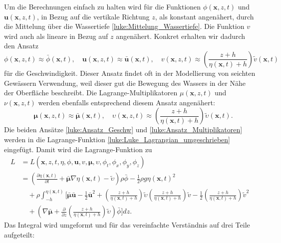 Um die Berechnungen einfach zu halten wird für die Funktionen $\phi (\bm{x},z,t)$ und $\bm{u} (\bm{x},z,t)$, in Bezug auf die vertikale Richtung $z$, als konstant angenähert, durch die Mittelung über die Wassertiefe \eqref{luke:Mittelung_Wassertiefe}.
Die Funktion $v$ wird auch als lineare in Bezug auf $z$ angenähert. 
Konkret erhalten wir dadurch den Ansatz
\begin{equation}
	\phi(\bm{x},z,t) \approx \bar{\phi}(\bm{x}, t), \quad \bm{u}(\bm{x},z,t) \approx \bar{\bm{u}}(\bm{x}, t), \quad v(\bm{x},z,t) \approx \left(\frac{z + h}{\eta(\bm{x}, t) + h}\right) \tilde{v}(\bm{x}, t)
	\label{luke:Ansatz_Geschw}
\end{equation}
für die Geschwindigkeit.
Dieser Ansatz findet oft in der Modellierung von seichten Gewässern Verwendung, weil dieser gut die Bewegung des Wassers in der Nähe der Oberfläche beschreibt.
Die Lagrange-Multiplikatoren $\mu(\bm{x},z,t)$ und $\nu(\bm{x},z,t)$ werden ebenfalls entsprechend diesem Ansatz angenähert:
\begin{equation}
	\quad \bm{\mu}(\bm{x},z,t) \approx \bar{\bm{\mu}}(\bm{x}, t), \quad \upsilon(\bm{x},z,t) \approx \left(\frac{z + h}{\eta(\bm{x}, t) + h}\right)\tilde{\upsilon}(\bm{x}, t).
	\label{luke:Ansatz_Multiplikatoren}
\end{equation}
Die beiden Ansätze \eqref{luke:Ansatz_Geschw} und \eqref{luke:Ansatz_Multiplikatoren} werden in die Lagrange-Funktion \eqref{luke:Luke_Lagrangian_umgeschrieben} eingefügt.
Damit wird die Lagrange-Funktion zu
\begin{align*}
	L&=
	L(\bm{x},z,t,\eta,\phi,\bm{u}, v, \bm{\mu},\upsilon,\phi_t,\phi_x,\phi_y,\phi_z)
	\\
	&=
	\left(\frac{\partial \eta(\bm{x}, t)}{\partial t}
	+
	\bar{\bm{\mu}}  \nabla \eta(\bm{x}, t)
	-
	\widetilde{\upsilon}\right)\rho \bar{\phi}
	-
	\frac{1}{2} \rho g \eta(\bm{x}, t)^2
	\\
	&\quad+
	\rho\int_{-h}^{\eta(\bm{x}, t)} \Bigg[ \bar{\bm{\mu}}  \bar{\bm{u}} - \frac{1}{2} \bar{\bm{u}}^2 +\left(\frac{z + h}{\eta(\bm{x}, t) + h}\right)\tilde{\upsilon} \left(\frac{z + h}{\eta(\bm{x}, t) + h}\right)\tilde{v} - \frac{1}{2} \left(\frac{z + h}{\eta(\bm{x}, t) + h}\right)\tilde{v}^2 
	\\
	&\quad+\left(\nabla \bar{\bm{\mu}} + \frac{\partial}{\partial z} \left(\frac{z + h}{\eta(\bm{x}, t) + h}\right)\tilde{\upsilon}\right) \bar{\phi} \Bigg] dz.
\end{align*}
Das Integral wird umgeformt und für das vereinfachte Verständnis auf drei Teile aufgeteilt:
